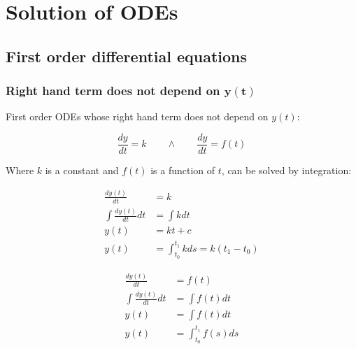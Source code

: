 \section{Solution of ODEs}

\subsection{First order differential equations}

	\subsubsection{Right hand term does not depend on $\mathbf{y(t)}$}
	First order ODEs whose right hand term does not depend on $y(t)$:

	$$\frac{dy}{dt} = k\qquad\land\qquad\frac{dy}{dt} = f(t)$$

	Where $k$ is a constant and $f(t)$ is a function of $t$, can be solved by integration:

	\begin{align*}
		\frac{dy(t)}{dt} &= k\\
		\int\frac{dy(t)}{dt}dt &= \int kdt\\
		y(t) &= kt + c\\
		y(t) &=\int_{t_0}^{t_1}kds = k(t_1-t_0)
	\end{align*}

	\begin{align*}
		\frac{dy(t)}{dt} &= f(t)\\
		\int\frac{dy(t)}{dt}dt &= \int f(t)dt\\
		y(t) &= \int f(t)dt\\
		y(t) &= \int_{t_0}^{t_1}f(s)ds
	\end{align*}
